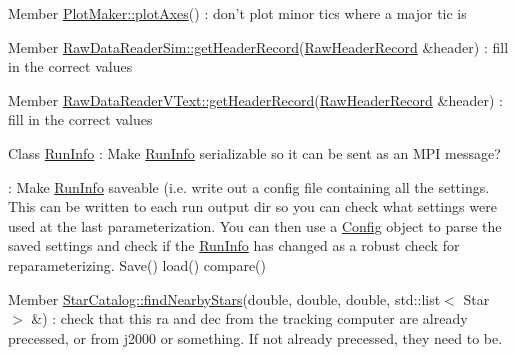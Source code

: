 \label{todo__todo000030}
\hypertarget{todo__todo000030}{}
 
\begin{DoxyDescription}
\item[Member \hyperlink{classPlotMaker_a7a63b2f17f113ee6b880aebf1cba1d91}{PlotMaker::plotAxes}() ]: don't plot minor tics where a major tic is 
\end{DoxyDescription}

\label{todo__todo000008}
\hypertarget{todo__todo000008}{}
 
\begin{DoxyDescription}
\item[Member \hyperlink{classRawDataReaderSim_acd4f407d9c8b8df95eb88213e6625f5f}{RawDataReaderSim::getHeaderRecord}(\hyperlink{structRawHeaderRecord}{RawHeaderRecord} \&header) ]: fill in the correct values 
\end{DoxyDescription}

\label{todo__todo000009}
\hypertarget{todo__todo000009}{}
 
\begin{DoxyDescription}
\item[Member \hyperlink{classRawDataReaderVText_a7fb3e50fa41df971c06c1b424c713675}{RawDataReaderVText::getHeaderRecord}(\hyperlink{structRawHeaderRecord}{RawHeaderRecord} \&header) ]: fill in the correct values 
\end{DoxyDescription}

\label{todo__todo000002}
\hypertarget{todo__todo000002}{}
 
\begin{DoxyDescription}
\item[Class \hyperlink{classRunInfo}{RunInfo} ]: Make \hyperlink{classRunInfo}{RunInfo} serializable so it can be sent as an MPI message?

: Make \hyperlink{classRunInfo}{RunInfo} saveable (i.e. write out a config file containing all the settings. This can be written to each run output dir so you can check what settings were used at the last parameterization. You can then use a \hyperlink{classConfig}{Config} object to parse the saved settings and check if the \hyperlink{classRunInfo}{RunInfo} has changed as a robust check for reparameterizing. Save() load() compare()
\end{DoxyDescription}

\label{todo__todo000031}
\hypertarget{todo__todo000031}{}
 
\begin{DoxyDescription}
\item[Member \hyperlink{classStarCatalog_a067a6b3ebbeed3d8c1450cc7092a9f64}{StarCatalog::findNearbyStars}(double, double, double, std::list$<$ Star $>$ \&) ]: check that this ra and dec from the tracking computer are already precessed, or from j2000 or something. If not already precessed, they need to be. 
\end{DoxyDescription}

